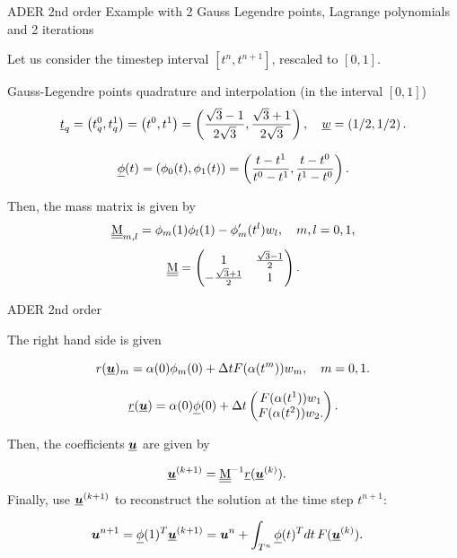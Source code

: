\documentclass[9pt,compress,t,aspectratio=169]{beamer}
\begin{document}
\begin{frame}{ADER 2nd order}
	Example with 2 Gauss Legendre points, Lagrange polynomials and 2 iterations

	Let us consider the timestep interval $[t^n,t^{n+1}]$, rescaled to $[0,1]$. 
	
	Gauss-Legendre points  quadrature and interpolation (in the interval $[0,1]$) 
	\[\underline{t}_q =  \left( t^0_q, t^1_q \right) = \left( t^0, t^1 \right) =  \left( \frac{\sqrt{3}-1}{2\sqrt{3}}, \frac{\sqrt{3}+1}{2\sqrt{3}} \right), \quad \underline{w} = \left(1/2,1/2\right). \]
	
	\[\underline{\phi}(t) = \left( \phi_0(t), \phi_1(t) \right) = \left( \frac{t-t^1}{t^0-t^1}, \frac{t-t^0}{t^1-t^0} \right). \]
	
	Then, the mass matrix is given by
	\[\underline{\underline{\mathrm{M}}}_{m,l} = \phi_m(1)\phi_l(1) - \phi'_m(t^l) w_l, \quad m, l = 0,1,\]
	\[ \underline{\underline{\mathrm{M}}} =
	\begin{pmatrix}
		1   & \frac{\sqrt{3}-1}{2}  \\
		-\frac{\sqrt{3}+1}{2}   & 1
	\end{pmatrix}.\]

\end{frame}

\begin{frame}{ADER 2nd order}

	The right hand side is given 
	
	\[ r(\underline{\boldsymbol{u}})_m = \alpha(0) \phi_m(0) + \Delta t F(\alpha(t^m)) w_m, \quad m=0,1. \] 
	
	\[ \underline{r}(\underline{\boldsymbol{u}}) = \alpha(0)\underline{\phi}(0) +\Delta t
	\begin{pmatrix}
		F(\alpha(t^1)) w_1  \\
		F(\alpha(t^2)) w_2.
	\end{pmatrix}.\]
	
	
	Then, the coefficients $\underline{\boldsymbol{u}}$ are given by
	
	\begin{align*}
		\underline{\boldsymbol{u}}^{(k+1)} &= \underline{\underline{\mathrm{M}}}^{-1} \underline{r}( \underline{\boldsymbol{u}}^{(k)} ).
	\end{align*}
	Finally, use $\underline{\boldsymbol{u}}^{(k+1)}$ to reconstruct the solution at the time step $t^{n+1}$:
	
	\begin{align*}
		\boldsymbol{u}^{n+1} &= \underline{\phi}(1)^T \underline{\boldsymbol{u}}^{(k+1)}=\boldsymbol{u}^n + \int_{T^n}\underline{\phi}(t)^T dt\, F(\underline{\boldsymbol{u}}^{(k)}).
	\end{align*}
	
	
\end{frame}
\end{document}
